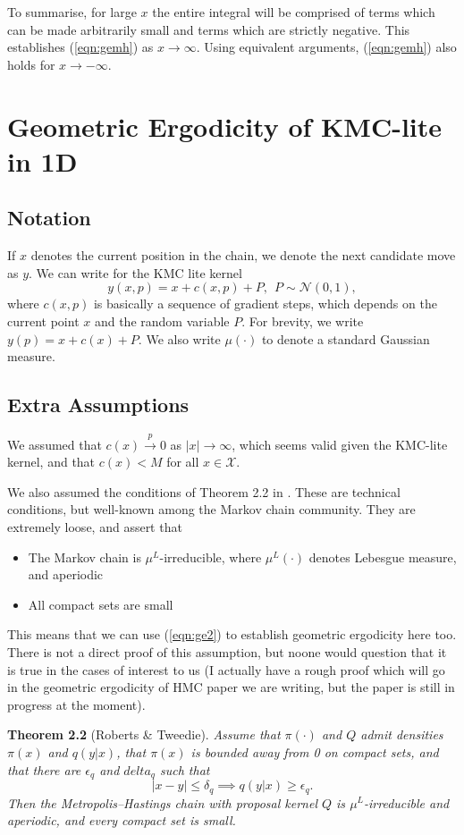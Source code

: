 \documentclass{article}
\newcommand{\X}{\mathcal{X}}
\begin{document}
To summarise, for large $x$ the entire integral will be comprised of terms which can be made arbitrarily small and terms which are strictly negative. This establishes (\ref{eqn:gemh}) as $x \to \infty$. Using equivalent arguments, (\ref{eqn:gemh}) also holds for $x \to -\infty$.

\section{Geometric Ergodicity of KMC-lite in 1D}

\subsection{Notation}

If $x$ denotes the current position in the chain, we denote the next candidate move as $y$.  We can write for the KMC lite kernel
\[
y(x,p) = x + c(x,p) + P, ~~ P \sim \mathcal{N}(0,1),
\]
where $c(x,p)$ is basically a sequence of gradient steps, which depends on the current point $x$ and the random variable $P$.  For brevity, we write $y(p) = x + c(x) + P$.  We also write $\mu(\cdot)$ to denote a standard Gaussian measure.

\subsection{Extra Assumptions}

We assumed that $c(x) \xrightarrow{p} 0$ as $|x| \to \infty$, which seems valid given the KMC-lite kernel, and that $c(x) < M$ for all $x \in \X$.

We also assumed the conditions of Theorem 2.2 in \cite{}.  These are technical conditions, but well-known among the Markov chain community.  They are extremely loose, and assert that
\begin{itemize}
\item The Markov chain is $\mu^L$-irreducible, where $\mu^L(\cdot)$ denotes Lebesgue measure, and aperiodic
\item All compact sets are small
\end{itemize}
This means that we can use (\ref{eqn:ge2}) to establish geometric ergodicity here too.  There is not a direct proof of this assumption, but noone would question that it is true in the cases of interest to us (I actually have a rough proof which will go in the geometric ergodicity of HMC paper we are writing, but the paper is still in progress at the moment).

\textbf{Theorem 2.2} (Roberts \& Tweedie).  {\itshape Assume that $\pi(\cdot)$ and $Q$ admit densities $\pi(x)$ and $q(y|x)$, that $\pi(x)$ is bounded away from 0 on compact sets, and that there are $\epsilon_q$ and $delta_q$ such that
\[
|x - y| \leq \delta_q \implies q(y|x) \geq \epsilon_q.
\]
Then the Metropolis--Hastings chain with proposal kernel $Q$ is $\mu^L$-irreducible and aperiodic, and every compact set is small.}
\end{document}

